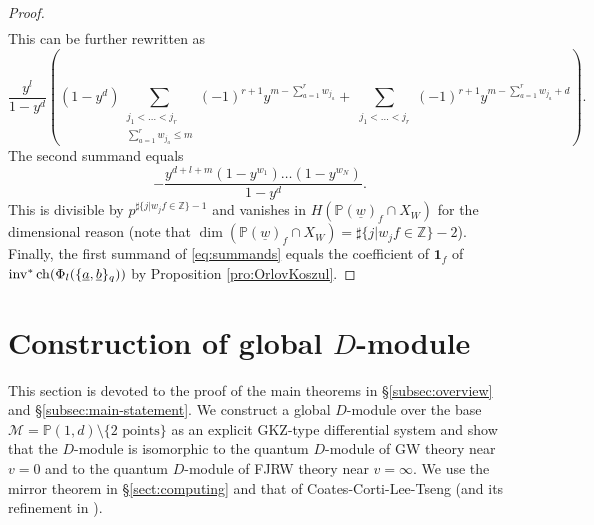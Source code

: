 \documentclass[11pt]{amsart}
\theoremstyle{definition} %
\theoremstyle{remark} %
\newcommand{\PP}{\mathbb P}
\newcommand{\ZZ}{\mathbb Z}
\newcommand{\ch}{{\rm ch}}
\def\fracp#1{\left\langle #1 \right\rangle}
\newcommand{\cM}{\mathcal{M}}
\newcommand{\cMo}{\mathcal{M}^\circ}
\newcommand{\unit}{\boldsymbol{1}}
\newcommand{\inv}{\operatorname{inv}}
\newcommand{\uw}{\underline{w}}
\newcommand{\ua}{\underline{a}}
\newcommand{\ub}{\underline{b}}
\begin{document}
\begin{proof}
\begin{align*}
\end{align*} 
This can be further rewritten as 
\begin{equation}
\label{eq:summands}
\frac{y^l}{1-y^d} 
\left( 
(1-y^d) \sum_{\substack{{j_1<\dots<j_r}\\ 
\sum_{a=1}^r w_{j_a} \le m}}  
(-1)^{r+1} y^{m-\sum_{a=1}^r w_{j_a}} + 
\sum_{\substack{{j_1<\dots<j_r}}} 
(-1)^{r+1}y^{m- \sum_{a=1}^r w_{j_a}+d} 
\right).     
\end{equation} 
The second summand equals 
\[
- \frac{y^{d+l+m}
(1-y^{w_1})\dots(1-y^{w_N})}{1-y^d}. 
\]
This is divisible by $p^{\sharp\{j|w_j f \in \ZZ\}-1}$ 
and vanishes 
in $H(\PP(\uw)_f \cap X_W)$ for the dimensional reason  
(note that $\dim (\PP(\uw)_f \cap X_W) = \sharp\{j| w_j f \in \ZZ\} -2$). 
Finally, the first summand of \eqref{eq:summands} 
equals the coefficient of $\unit_f$ of 
$\inv^*\ch(\Phi_l(\{\ua,\ub\}_q))$ 
by Proposition \ref{pro:OrlovKoszul}. 
\end{proof}

\section{Construction of global $D$-module}
\label{sec:globalDmod}

This section is devoted to the proof of 
the main theorems in \S \ref{subsec:overview} and 
\S \ref{subsec:main-statement}.   
We construct a global $D$-module 
over the base $\cM = \PP(1,d)\setminus \{\text{2 points}\}$  
as an explicit GKZ-type differential system 
and show that the $D$-module is isomorphic to 
the quantum $D$-module of GW theory 
near $v= 0$ 
and to the quantum $D$-module of FJRW theory 
near $v=\infty$. 
We use the mirror theorem in 
\S \ref{sect:computing} and that of Coates-Corti-Lee-Tseng 
\cite{CCLT} (and its refinement in \cite{Iritani:period}).  
\end{document}

